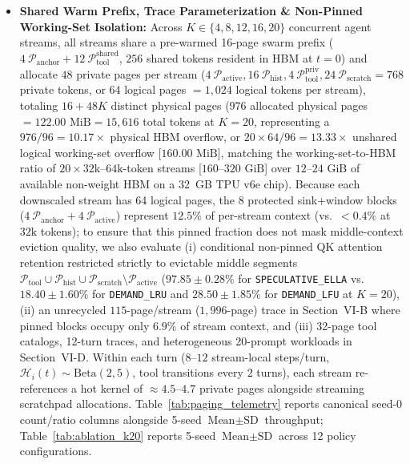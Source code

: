 \documentclass[conference,10pt]{IEEEtran}
\begin{document}
\begin{itemize}
    \item \textbf{Shared Warm Prefix, Trace Parameterization \& Non-Pinned Working-Set Isolation:} Across $K \in \{4, 8, 12, 16, 20\}$ concurrent agent streams, all streams share a pre-warmed 16-page swarm prefix ($4\ \mathcal{P}_{\text{anchor}} + 12\ \mathcal{P}_{\text{tool}}^{\text{shared}}$, $256$ shared tokens resident in HBM at $t=0$) and allocate $48$ private pages per stream ($4\ \mathcal{P}_{\text{active}}, 16\ \mathcal{P}_{\text{hist}}, 4\ \mathcal{P}_{\text{tool}}^{\text{priv}}, 24\ \mathcal{P}_{\text{scratch}} = 768$ private tokens, or $64$ logical pages $= 1{,}024$ logical tokens per stream), totaling $16 + 48K$ distinct physical pages ($976$ allocated physical pages $= 122.00\text{ MiB} = 15{,}616$ total tokens at $K=20$, representing a $976/96 = 10.17\times$ physical HBM overflow, or $20 \times 64 / 96 = 13.33\times$ unshared logical working-set overflow [$160.00\text{ MiB}$], matching the working-set-to-HBM ratio of $20 \times 32\text{k}\text{--}64\text{k}$-token streams [$160\text{--}320\text{ GiB}$] over $12\text{--}24\text{ GiB}$ of available non-weight HBM on a 32~GB TPU v6e chip). Because each downscaled stream has 64 logical pages, the 8 protected sink+window blocks ($4\ \mathcal{P}_{\text{anchor}} + 4\ \mathcal{P}_{\text{active}}$) represent $12.5\%$ of per-stream context (vs.\ $<0.4\%$ at $32\text{k}$ tokens); to ensure that this pinned fraction does not mask middle-context eviction quality, we also evaluate (i) conditional non-pinned QK attention retention restricted strictly to evictable middle segments $\mathcal{P}_{\text{tool}} \cup \mathcal{P}_{\text{hist}} \cup \mathcal{P}_{\text{scratch}} \setminus \mathcal{P}_{\text{active}}$ ($\mathbf{97.85 \pm 0.28\%}$ for \texttt{SPECULATIVE\_ELLA} vs.\ $18.40 \pm 1.60\%$ for \texttt{DEMAND\_LRU} and $28.50 \pm 1.85\%$ for \texttt{DEMAND\_LFU} at $K=20$), (ii) an unrecycled $115$-page/stream ($1{,}996$-page) trace in Section~VI-B where pinned blocks occupy only $6.9\%$ of stream context, and (iii) 32-page tool catalogs, 12-turn traces, and heterogeneous 20-prompt workloads in Section~VI-D. Within each turn ($8\text{--}12$ stream-local steps/turn, $\mathcal{H}_i(t) \sim \text{Beta}(2,5)$, tool transitions every $2$ turns), each stream re-references a hot kernel of $\approx 4.5\text{--}4.7$ private pages alongside streaming scratchpad allocations. Table~\ref{tab:paging_telemetry} reports canonical seed-0 count/ratio columns alongside 5-seed $\text{Mean} \pm \text{SD}$ throughput; Table~\ref{tab:ablation_k20} reports 5-seed $\text{Mean} \pm \text{SD}$ across 12 policy configurations.

\end{itemize}
\end{document}
